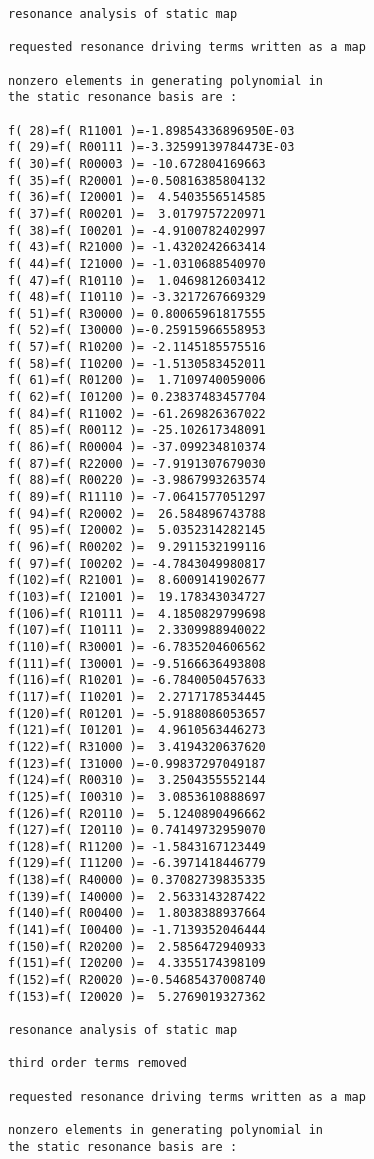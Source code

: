 \begin{footnotesize}
\begin{verbatim}
resonance analysis of static map

requested resonance driving terms written as a map

nonzero elements in generating polynomial in
the static resonance basis are :

f( 28)=f( R11001 )=-1.89854336896950E-03
f( 29)=f( R00111 )=-3.32599139784473E-03
f( 30)=f( R00003 )= -10.672804169663
f( 35)=f( R20001 )=-0.50816385804132
f( 36)=f( I20001 )=  4.5403556514585
f( 37)=f( R00201 )=  3.0179757220971
f( 38)=f( I00201 )= -4.9100782402997
f( 43)=f( R21000 )= -1.4320242663414
f( 44)=f( I21000 )= -1.0310688540970
f( 47)=f( R10110 )=  1.0469812603412
f( 48)=f( I10110 )= -3.3217267669329
f( 51)=f( R30000 )= 0.80065961817555
f( 52)=f( I30000 )=-0.25915966558953
f( 57)=f( R10200 )= -2.1145185575516
f( 58)=f( I10200 )= -1.5130583452011
f( 61)=f( R01200 )=  1.7109740059006
f( 62)=f( I01200 )= 0.23837483457704
f( 84)=f( R11002 )= -61.269826367022
f( 85)=f( R00112 )= -25.102617348091
f( 86)=f( R00004 )= -37.099234810374
f( 87)=f( R22000 )= -7.9191307679030
f( 88)=f( R00220 )= -3.9867993263574
f( 89)=f( R11110 )= -7.0641577051297
f( 94)=f( R20002 )=  26.584896743788
f( 95)=f( I20002 )=  5.0352314282145
f( 96)=f( R00202 )=  9.2911532199116
f( 97)=f( I00202 )= -4.7843049980817
f(102)=f( R21001 )=  8.6009141902677
f(103)=f( I21001 )=  19.178343034727
f(106)=f( R10111 )=  4.1850829799698
f(107)=f( I10111 )=  2.3309988940022
f(110)=f( R30001 )= -6.7835204606562
f(111)=f( I30001 )= -9.5166636493808
f(116)=f( R10201 )= -6.7840050457633
f(117)=f( I10201 )=  2.2717178534445
f(120)=f( R01201 )= -5.9188086053657
f(121)=f( I01201 )=  4.9610563446273
f(122)=f( R31000 )=  3.4194320637620
f(123)=f( I31000 )=-0.99837297049187
f(124)=f( R00310 )=  3.2504355552144
f(125)=f( I00310 )=  3.0853610888697
f(126)=f( R20110 )=  5.1240890496662
f(127)=f( I20110 )= 0.74149732959070
f(128)=f( R11200 )= -1.5843167123449
f(129)=f( I11200 )= -6.3971418446779
f(138)=f( R40000 )= 0.37082739835335
f(139)=f( I40000 )=  2.5633143287422
f(140)=f( R00400 )=  1.8038388937664
f(141)=f( I00400 )= -1.7139352046444
f(150)=f( R20200 )=  2.5856472940933
f(151)=f( I20200 )=  4.3355174398109
f(152)=f( R20020 )=-0.54685437008740
f(153)=f( I20020 )=  5.2769019327362

resonance analysis of static map

third order terms removed

requested resonance driving terms written as a map

nonzero elements in generating polynomial in
the static resonance basis are :


\end{verbatim}
\end{footnotesize}
